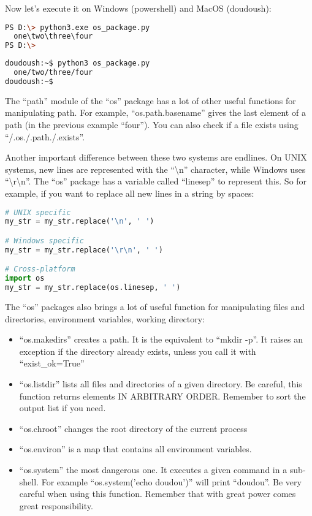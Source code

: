 Now let's execute it on Windows (powershell) and MacOS (doudoush):

\begin{lstlisting}[language=bash]
PS D:\> python3.exe os_package.py
  one\two\three\four
PS D:\>
\end{lstlisting}

\begin{lstlisting}[language=bash]
doudoush:~$ python3 os_package.py
  one/two/three/four
doudoush:~$
\end{lstlisting}

The ``path'' module of the ``os'' package has a lot of other useful functions for
manipulating path. For example, ``os.path.basename'' gives the last element of a path
(in the previous example ``four''). You can also check if a file exists using ``/.os./.path./.exists''.


\vspace{5mm}

Another important difference between these two systems are endlines. On UNIX systems,
new lines are represented with the ``\textbackslash n'' character, while
Windows uses ``\textbackslash r\textbackslash n''.
The ``os'' package has a variable called ``linesep'' to represent this. So for example,
if you want to replace all new lines in a string by spaces:

\begin{lstlisting}[language=python]
# UNIX specific
my_str = my_str.replace('\n', ' ')

# Windows specific
my_str = my_str.replace('\r\n', ' ')

# Cross-platform
import os
my_str = my_str.replace(os.linesep, ' ')
\end{lstlisting}

\vspace{5mm}

The ``os'' packages also brings a lot of useful function for manipulating files
and directories, environment variables, working directory:

\begin{itemize}
\item ``os.makedirs'' creates a path. It is the equivalent to ``mkdir -p''.
  It raises an exception if the directory already exists, unless you call it
  with ``exist\_ok=True''
\item ``os.listdir'' lists all files and directories of a given directory.
  Be careful, this function returns elements IN ARBITRARY ORDER. Remember
  to sort the output list if you need.
\item ``os.chroot'' changes the root directory of the current process
\item ``os.environ'' is a map that contains all environment variables.
\item ``os.system'' the most dangerous one. It executes a given command in a sub-shell.
  For example ``os.system('echo doudou')'' will print ``doudou''. Be very careful
  when using this function. Remember that with great power comes great responsibility.
\end{itemize}


